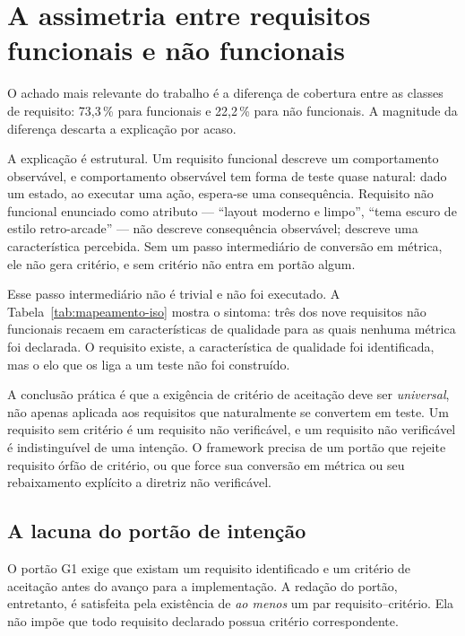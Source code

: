 \section{A assimetria entre requisitos funcionais e não funcionais}
\label{sec:disc-assimetria}

O achado mais relevante do trabalho é a diferença de cobertura entre as classes
de requisito: 73,3\,\% para funcionais e 22,2\,\% para não funcionais. A
magnitude da diferença descarta a explicação por acaso.

A explicação é estrutural. Um requisito funcional descreve um comportamento
observável, e comportamento observável tem forma de teste quase natural: dado um
estado, ao executar uma ação, espera-se uma consequência. Requisito não funcional
enunciado como atributo --- ``layout moderno e limpo'', ``tema escuro de estilo
retro-arcade'' --- não descreve consequência observável; descreve uma
característica percebida. Sem um passo intermediário de conversão em métrica, ele
não gera critério, e sem critério não entra em portão algum.

Esse passo intermediário não é trivial e não foi executado. A
Tabela~\ref{tab:mapeamento-iso} mostra o sintoma: três dos nove requisitos não
funcionais recaem em características de qualidade para as quais nenhuma métrica
foi declarada. O requisito existe, a característica de qualidade foi
identificada, mas o elo que os liga a um teste não foi construído.

A conclusão prática é que a exigência de critério de aceitação deve ser
\emph{universal}, não apenas aplicada aos requisitos que naturalmente se
convertem em teste. Um requisito sem critério é um requisito não verificável, e um
requisito não verificável é indistinguível de uma intenção. O framework precisa
de um portão que rejeite requisito órfão de critério, ou que force sua
conversão em métrica ou seu rebaixamento explícito a diretriz não verificável.

\subsection{A lacuna do portão de intenção}
\label{sec:disc-lacunas-do-gate}

O portão G1 exige que existam um requisito identificado e um critério de
aceitação antes do avanço para a implementação. A redação do portão, entretanto,
é satisfeita pela existência de \emph{ao menos} um par requisito--critério. Ela
não impõe que todo requisito declarado possua critério correspondente.

